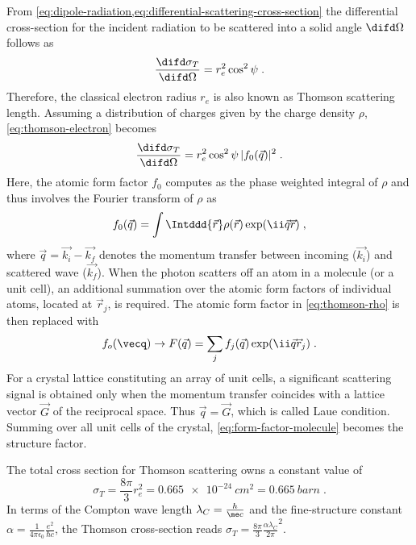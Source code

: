 \documentclass[
twoside,
openright,
titlepage,
numbers=noenddot,
headinclude,
fleqn,
a4paper,
footinclude=true,
cleardoublepage=empty,
abstractoff,
BCOR=5mm,
paper=a4,
fontsize=11pt,
british,ngerman,american,
]{scrreprt}
\begin{document}
From
\cref{eq:dipole-radiation,eq:differential-scattering-cross-section}
the differential cross-section for the incident radiation to be
scattered into a solid angle $\difd\Omega$ follows as
\begin{equation}
  \label{eq:thomson-electron}         
  \frac{\difd\sigma_T}{\difd\Omega}=r_e^2 \cos^2\psi \;.
\end{equation}
Therefore, the classical electron radius $r_e$ is also known as
Thomson scattering length.  Assuming a distribution of charges given
by the charge density $\rho$, \cref{eq:thomson-electron}
becomes
\begin{equation}
  \label{eq:thomson-rho}         
  \frac{\difd\sigma_T}{\difd\Omega} = 
  r_e^2 \cos^2\psi\, |f_0(\vec{q})|^2 \;.
\end{equation}
Here, the atomic form factor $f_0$ computes as the phase\hyph
weighted integral of $\rho$ and  thus involves the Fourier transform
of $\rho$ as
\begin{equation}
  \label{eq:form-factor}
  f_0(\vec{q})=
  \int\Intddd{\vec{r}}\rho(\vec{r})\exp(\ii \vec{q}\vec{r}) \;,
\end{equation}
where $\vec{q}=\vec{k_i}-\vec{k_f}$ denotes the momentum transfer
between incoming ($\vec{k_i}$) and scattered wave ($\vec{k_f}$).  When
the photon scatters off an atom in a molecule (or a unit cell), an
additional summation over the atomic form factors of individual atoms,
located at $\vec{r}_j$, is required.  The atomic form factor in
\cref{eq:thomson-rho} is then replaced with
\begin{equation}
  \label{eq:form-factor-molecule}
  f_o(\vecq) \to F(\vec{q}) = 
  \sum_{j} f_j(\vec{q})\exp(\ii\vec{q}\vec{r}_j)\;.
\end{equation}
For a crystal lattice constituting an array of unit cells, a
significant scattering signal is obtained only when the momentum
transfer coincides with a lattice vector $\vec{G}$ of the reciprocal
space.  Thus $\vec{q}=\vec{G}$, which is called Laue condition.
Summing over all unit cells of the crystal,
\cref{eq:form-factor-molecule} becomes the structure factor.

The total cross section for Thomson scattering owns a constant value
of
\begin{equation}
  \label{eq:thomson-cross-section}         
  \sigma_T = \frac{8\pi}{3}r_e^2 
  = \SI{0.665e-24}{cm^2} = \SI{0.665}{barn} \;.
\end{equation}
In terms of the Compton wave length $\lambda_C=\frac{h}{\me c}$ and
the fine-structure constant
$\alpha=\frac{1}{4\pi\epsilon_0}\frac{e^2}{\hbar c}$, the Thomson
cross-section reads $\sigma_T = \frac{8\pi}{3}
\frac{\alpha\lambda_C}{2\pi}^2$.
\end{document}
